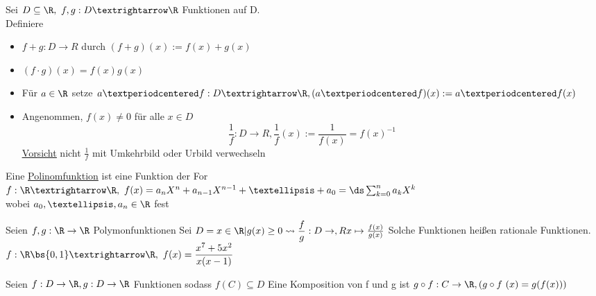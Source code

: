 %
Sei $D\subseteq \R , \ f,g: D→\R$ Funktionen auf D.\\
Definiere
\begin{itemize}
\item{$f+g: D \to R$ durch $(f + g)(x) := f(x) + g(x)$}
\item{$(f \cdot  g) (x) = f(x) g(x)$}
\item{Für $a\in\R$ setze $a·f: D→\R, (a·f)(x):=a·f(x)$}
\item{Angenommen, $f(x) \neq 0$ für alle $x \in D$ \\
$$\frac{1}{f}: D \to R, \frac{1}{f}(x) := \frac{1}{f(x)} = f(x)^{-1}$$
\underline{\underline{Vorsicht}} nicht $\frac{1}{f}$ mit Umkehrbild oder Urbild verwechseln}
\end{itemize}
%
\begin{itemize}
\item{Eine \underline{Polinomfunktion} ist eine Funktion der For\\
$f:\R→\R,\ f(x)=a_nX^n+a_{n-1}X^{n-1}+…+a_0=\ds\sum_{k=0}^na_kX^k $\\
wobei $a_0,…,a_n\in\R$ fest
%
\item{Seien $f, g : \R \to \R $ Polymonfunktionen
Sei $D = {x \in \R | g(x) \geq 0}\leadsto \dfrac{f}{g} : D \to , Rx \mapsto \frac{f(x)}{g(x)}$
Solche Funktionen heißen rationale Funktionen.}
\bsp
$f:\R\bs\{0,1\}→\R, \ f(x)=\dfrac{x^7+5x^2}{x(x-1)}$}
\end{itemize}
Seien $f: D \to \R, g: D \to \R$ Funktionen sodass $f(C) \subseteq D$
Eine Komposition von f und g ist 
%
$g \circ f : C \to \R, (g \circ f \ (x) = g(f(x)))$